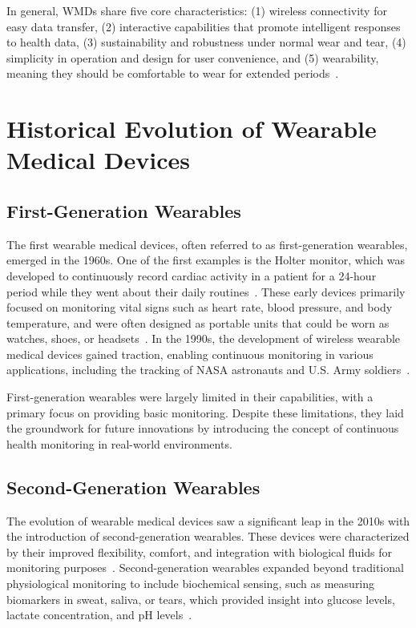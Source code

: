 \documentclass[journal]{IEEEtran}
\begin{document}
    In general, WMDs share five core characteristics: (1) wireless connectivity for easy data transfer, (2) interactive capabilities that promote intelligent responses to health data, (3) sustainability and robustness under normal wear and tear, (4) simplicity in operation and design for user convenience, and (5) wearability, meaning they should be comfortable to wear for extended periods~\cite{Lu2020}.

\section{Historical Evolution of Wearable Medical Devices}
    \subsection{First-Generation Wearables}

    The first wearable medical devices, often referred to as first-generation wearables, emerged in the 1960s. One of the first examples is the Holter monitor, which was developed to continuously record cardiac activity in a patient for a 24-hour period while they went about their daily routines~\cite{Ates2022}. These early devices primarily focused on monitoring vital signs such as heart rate, blood pressure, and body temperature, and were often designed as portable units that could be worn as watches, shoes, or headsets~\cite{Fotiadis2006}. In the 1990s, the development of wireless wearable medical devices gained traction, enabling continuous monitoring in various applications, including the tracking of NASA astronauts and U.S. Army soldiers~\cite{Luo2024}.

    First-generation wearables were largely limited in their capabilities, with a primary focus on providing basic monitoring. Despite these limitations, they laid the groundwork for future innovations by introducing the concept of continuous health monitoring in real-world environments.

    \subsection{Second-Generation Wearables}
    
    The evolution of wearable medical devices saw a significant leap in the 2010s with the introduction of second-generation wearables. These devices were characterized by their improved flexibility, comfort, and integration with biological fluids for monitoring purposes~\cite{Ates2022}. Second-generation wearables expanded beyond traditional physiological monitoring to include biochemical sensing, such as measuring biomarkers in sweat, saliva, or tears, which provided insight into glucose levels, lactate concentration, and pH levels~\cite{Luo2024}.
\end{document}
